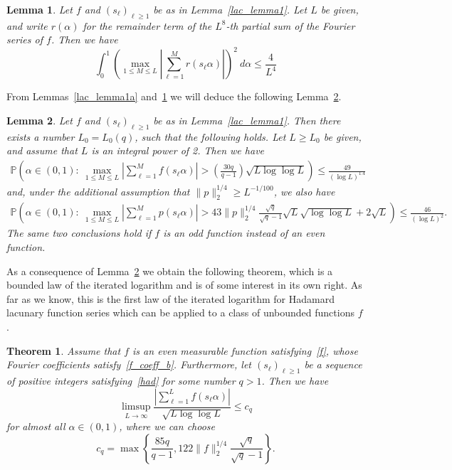 \documentclass[12pt]{amsart}
\newtheorem{lemma}{Lemma}
\newtheorem{theorem}{Theorem}
\newcommand {\p} {\mathbb{P}}
\begin{document}
\begin{lemma} \label{lac_lemma2}
Let $f$ and $(s_\ell)_{\ell \geq 1}$ be as in Lemma~\ref{lac_lemma1}. Let $L$ be given, and write $r(\alpha)$ for the remainder term of the $L^{8}$-th partial sum of the Fourier series of $f$. Then we have
$$
\int_0^1 \left( \max_{1 \leq M \leq L} \left| \sum_{\ell=1}^{M} r(s_\ell \alpha) \right| \right)^2 ~d\alpha \leq \frac{4}{L^4}
$$
\end{lemma}

From Lemmas~\ref{lac_lemma1a} and~\ref{lac_lemma2} we will deduce the following Lemma~\ref{lac_lemma3}.

\begin{lemma} \label{lac_lemma3}
Let $f$ and $(s_\ell)_{\ell \geq 1}$ be as in Lemma~\ref{lac_lemma1}. Then there exists a number $L_0 = L_0(q)$, such that the following holds. Let $L \geq L_0$ be given, and assume that $L$ is an integral power of 2. Then we have
\begin{eqnarray*}
\p \left( \alpha \in (0,1):~\max_{1 \leq M \leq L} \left| \sum_{\ell=1}^M f(s_\ell \alpha) \right| > \left( \frac{30 q}{q-1} \right) \sqrt{L \log \log L} \right) \leq \frac{49}{(\log L)^{1.4}}
\end{eqnarray*}
and, under the additional assumption that $\|p\|_2^{1/4} \geq L^{-1/100}$, we also have
\begin{eqnarray*}
\p \left( \alpha \in (0,1):~\max_{1 \leq M \leq L} \left| \sum_{\ell=1}^M p(s_\ell \alpha) \right| > 43 \|p\|_2^{1/4} \frac{\sqrt{q}}{\sqrt{q}-1} \sqrt{L} \sqrt{\log \log L} + 2 \sqrt{L} \right) \leq \frac{46}{(\log L)^2}.
\end{eqnarray*}
The same two conclusions hold if $f$ is an odd function instead of an even function.
\end{lemma}

As a consequence of Lemma~\ref{lac_lemma3} we obtain the following theorem, which is a bounded law of the iterated logarithm and is of some interest in its own right. As far as we know, this is the first law of the iterated logarithm for Hadamard lacunary function series which can be applied to a class of unbounded functions $f$.\\

\begin{theorem} \label{lac_co1}
Assume that $f$ is an even measurable function satisfying~\eqref{f}, whose Fourier coefficients satisfy~\eqref{f_coeff_b}. Furthermore, let $(s_\ell)_{\ell \geq 1}$ be a sequence of positive integers satisfying~\eqref{had} for some number $q > 1$. Then we have
$$
\limsup_{L \to \infty} \frac{\left| \sum_{\ell=1}^L f(s_\ell \alpha) \right|}{\sqrt{L \log \log L}} \leq c_q
$$
for almost all $\alpha \in (0,1)$, where we can choose
$$
c_q = \max \left\{\frac{85 q}{q-1},  122 \|f\|_2^{1/4} \frac{\sqrt{q}}{\sqrt{q}-1} \right\}.
$$
\end{theorem}
~\\
\end{document}
